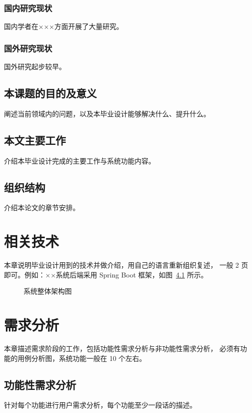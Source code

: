 \documentclass[fandol]{izdthesis}
\begin{document}
\subsection{国内研究现状}
国内学者在×××方面开展了大量研究\cite{example2024survey}。

\subsection{国外研究现状}
国外研究起步较早\cite{example2023foreign}。

\section{本课题的目的及意义}
阐述当前领域内的问题，以及本毕业设计能够解决什么、提升什么。

\section{本文主要工作}
介绍本毕业设计完成的主要工作与系统功能内容。

\section{组织结构}
介绍本论文的章节安排。

\chapter{相关技术}
本章说明毕业设计用到的技术并做介绍，用自己的语言重新组织复述，
一般 2 页即可。例如：××系统后端采用 Spring Boot
框架\cite{example2024springboot}，如图~\ref{fig:arch} 所示。

\begin{figure}[htbp]
  \centering
  \fbox{\rule{0pt}{3cm}\rule{6cm}{0pt}} %
  \caption{系统整体架构图}
  \label{fig:arch}
\end{figure}

\chapter{需求分析}
本章描述需求阶段的工作，包括功能性需求分析与非功能性需求分析，
必须有功能的用例分析图，系统功能一般在 10 个左右。

\section{功能性需求分析}
针对每个功能进行用户需求分析，每个功能至少一段话的描述。
\end{document}
